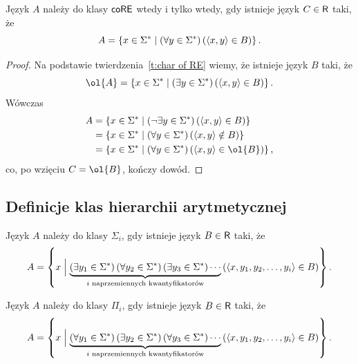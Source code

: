 \begin{theorem}\label{t:char of coRE}
    Język $A$ należy do klasy $\textsf{coRE}$ wtedy i tylko wtedy, gdy istnieje język $C \in \textsf{R}$ taki, że
    \[ A = \left\{x \in \Sigma^* \mid \left(\forall y \in \Sigma^* \right) \left(\left\langle x, y \right\rangle \in B\right) \right\}. \]
\end{theorem}
\begin{proof}
    Na podstawie twierdzenia~\ref{t:char of RE} wiemy, że istnieje język $B$ taki, że
    \[ \ol{A} = \left\{x \in \Sigma^* \mid \left(\exists y \in \Sigma^* \right) \left(\encode{x, y} \in B\right) \right\}. \]
    Wówczas
    \begin{align*}
        A &= \left\{x \in \Sigma^* \mid \left(\neg\exists y \in \Sigma^* \right) \left(\encode{x, y} \in B\right) \right\} \\
        &= \left\{x \in \Sigma^* \mid \left(\forall y \in \Sigma^* \right) \left(\encode{x, y} \notin B\right) \right\} \\
        &= \left\{x \in \Sigma^* \mid \left(\forall y \in \Sigma^* \right) \left(\encode{x, y} \in \ol{B}\right) \right\},
    \end{align*}
    co, po wzięciu $C = \ol{B}$, kończy dowód.
\end{proof}

\subsection{Definicje klas hierarchii arytmetycznej}

\begin{definition}
    Język $A$ należy do klasy $\Sigma_i$, gdy istnieje język $B \in \textsf{R}$ taki, że
    \[ A = \left\{x \Bigm|
    \underbrace{\left(\exists y_1 \in \Sigma^*\right) \left(\forall y_2 \in \Sigma^*\right) \left(\exists y_3 \in \Sigma^*\right) \cdots}_{i \text{ naprzemiennych kwantyfikatorów}}
    \left(\left\langle x, y_1, y_2, \ldots, y_i \right\rangle \in B\right)\right\}. \]
\end{definition}

\begin{definition}[klasa $\Pi_i$]
    Język $A$ należy do klasy $\Pi_i$, gdy istnieje język $B \in \textsf{R}$ taki, że
    \[ A = \left\{x \Bigm|
    \underbrace{\left(\forall y_1 \in \Sigma^*\right) \left(\exists y_2 \in \Sigma^*\right) \left(\forall y_3 \in \Sigma^*\right) \cdots}_{i \text{ naprzemiennych kwantyfikatorów}}
    \left(\left\langle x, y_1, y_2, \ldots, y_i \right\rangle \in B\right)\right\}. \]
\end{definition}


